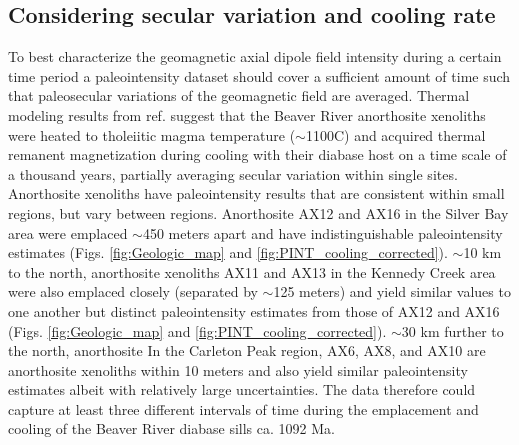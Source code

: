 \documentclass[9pt,twocolumn,twoside,lineno]{pnas-new}
\begin{document}
\subsection*{Considering secular variation and cooling rate}
To best characterize the geomagnetic axial dipole field intensity during a certain time period a paleointensity dataset should cover a sufficient amount of time such that paleosecular variations of the geomagnetic field are averaged. Thermal modeling results from ref. \citealp{Zhang2021b} suggest that the Beaver River anorthosite xenoliths were heated to tholeiitic magma temperature ($\sim$1100\textdegree C) and acquired thermal remanent magnetization during cooling with their diabase host on a time scale of a thousand years, partially averaging secular variation within single sites. Anorthosite xenoliths have paleointensity results that are consistent within small regions, but vary between regions. Anorthosite AX12 and AX16 in the Silver Bay area were emplaced $\sim$450 meters apart and have indistinguishable paleointensity estimates (Figs. \ref{fig:Geologic_map} and \ref{fig:PINT_cooling_corrected}). $\sim$10 km to the north, anorthosite xenoliths AX11 and AX13 in the Kennedy Creek area were also emplaced closely (separated by $\sim$125 meters) and yield similar values to one another but distinct paleointensity estimates from those of AX12 and AX16 (Figs. \ref{fig:Geologic_map} and \ref{fig:PINT_cooling_corrected}). $\sim$30 km further to the north, anorthosite In the Carleton Peak region, AX6, AX8, and AX10 are anorthosite xenoliths within 10 meters and also yield similar paleointensity estimates albeit with relatively large uncertainties. The data therefore could capture at least three different intervals of time during the emplacement and cooling of the Beaver River diabase sills ca. 1092 Ma. 
\end{document}
